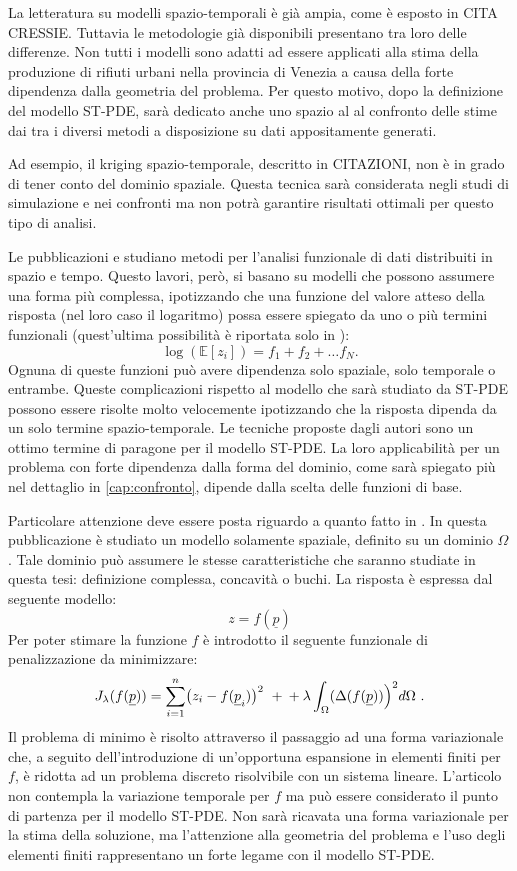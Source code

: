 \documentclass[a4paper,11pt,twoside,openright]{book}							%
\begin{document}
La letteratura su modelli spazio-temporali è già ampia, come è esposto in CITA CRESSIE. Tuttavia le metodologie già disponibili presentano tra loro delle differenze. Non tutti i modelli sono adatti ad essere applicati alla stima della produzione di rifiuti urbani nella provincia di Venezia a causa della forte dipendenza dalla geometria del problema. Per questo motivo, dopo la definizione del modello ST-PDE, sarà dedicato anche uno spazio al al confronto delle stime dai tra i diversi metodi a disposizione su dati appositamente generati.

Ad esempio, il kriging spazio-temporale, descritto in CITAZIONI, non è in grado di tener conto del dominio spaziale. Questa tecnica sarà considerata negli studi di simulazione e nei confronti ma non potrà garantire risultati ottimali per questo tipo di analisi.

Le pubblicazioni \cite{art:augustin} e \cite{art:marra} studiano metodi per l'analisi funzionale di dati distribuiti in spazio e tempo. Questo lavori, però, si basano su modelli che possono assumere una forma più complessa, ipotizzando che una funzione del valore atteso della risposta (nel loro caso il logaritmo) possa essere spiegato da uno o più termini funzionali (quest'ultima possibilità è riportata solo in \cite{art:augustin}):
$$
\log(\mathbb{E}[z_i])= f_1+f_2+ \ldots f_N .
$$
Ognuna di queste funzioni può avere dipendenza solo spaziale, solo temporale o entrambe. Queste complicazioni rispetto al modello che sarà studiato da ST-PDE possono essere risolte molto velocemente ipotizzando che la risposta dipenda da un solo termine spazio-temporale. Le tecniche proposte dagli autori sono un ottimo termine di paragone per il modello ST-PDE. La loro applicabilità per un problema con forte dipendenza dalla forma del dominio, come sarà spiegato più nel dettaglio in \ref{cap:confronto}, dipende dalla scelta delle funzioni di base. 

Particolare attenzione deve essere posta riguardo a quanto fatto in \cite{art:sangalli}. In questa pubblicazione è studiato un modello solamente spaziale, definito su un dominio $\Omega$. Tale dominio può assumere le stesse caratteristiche che saranno studiate in questa tesi: definizione complessa, concavità o buchi. La risposta è espressa dal seguente modello:
$$
z=f(\underline{p})
$$
Per poter stimare la funzione $f$ è introdotto il seguente funzionale di penalizzazione da minimizzare:
$$
J_{\lambda }(f(\underline p))=\sum_{i=1}^n \bigl( z_{i} - f(\underline p_i) \bigr)^2 \ + \\
+\lambda\int_{\Omega} ( \Delta(  f(\underline p)  ) \Bigr)^2 d \Omega \ .
$$
Il problema di minimo è risolto attraverso il passaggio ad una forma variazionale che, a seguito dell'introduzione di un'opportuna espansione in elementi finiti per $f$, è ridotta ad un problema discreto risolvibile con un sistema lineare. L'articolo \cite{art:sangalli} non contempla la variazione temporale per $f$ ma può essere considerato il punto di partenza per il modello ST-PDE. Non sarà ricavata una forma variazionale per la stima della soluzione, ma l'attenzione alla geometria del problema e l'uso degli elementi finiti rappresentano un forte legame con il modello ST-PDE.
\end{document}

